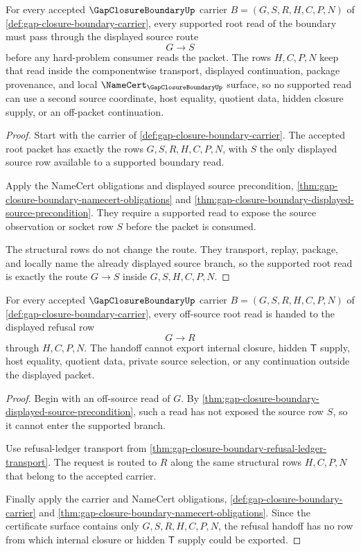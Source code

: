 \begin{theorem}
\label{thm:gap-closure-boundary-root-source-totality}
For every accepted $\GapClosureBoundaryUp$ carrier $B=(G,S,R,H,C,P,N)$ of \autoref{def:gap-closure-boundary-carrier}, every supported root read of the boundary must pass through the displayed source route
$$
G \longrightarrow S
$$
before any hard-problem consumer reads the packet. The rows $H,C,P,N$ keep that read inside the componentwise transport, displayed continuation, package provenance, and local $\NameCert_{\GapClosureBoundaryUp}$ surface, so no supported read can use a second source coordinate, host equality, quotient data, hidden closure supply, or an off-packet continuation.
\end{theorem}
\begin{proof}
Start with the carrier of \autoref{def:gap-closure-boundary-carrier}. The accepted root packet has exactly the rows $G,S,R,H,C,P,N$, with $S$ the only displayed source row available to a supported boundary read.

Apply the NameCert obligations and displayed source precondition, \autoref{thm:gap-closure-boundary-namecert-obligations} and \autoref{thm:gap-closure-boundary-displayed-source-precondition}. They require a supported read to expose the source observation or socket row $S$ before the packet is consumed.

The structural rows do not change the route. They transport, replay, package, and locally name the already displayed source branch, so the supported root read is exactly the route $G \longrightarrow S$ inside $G,S,H,C,P,N$.
\end{proof}

\begin{theorem}
\label{thm:gap-closure-boundary-root-refusal-handoff-totality}
For every accepted $\GapClosureBoundaryUp$ carrier $B=(G,S,R,H,C,P,N)$ of \autoref{def:gap-closure-boundary-carrier}, every off-source root read is handed to the displayed refusal row
$$
G \longrightarrow R
$$
through $H,C,P,N$. The handoff cannot export internal closure, hidden $\mathsf{T}$ supply, host equality, quotient data, private source selection, or any continuation outside the displayed packet.
\end{theorem}
\begin{proof}
Begin with an off-source read of $G$. By \autoref{thm:gap-closure-boundary-displayed-source-precondition}, such a read has not exposed the source row $S$, so it cannot enter the supported branch.

Use refusal-ledger transport from \autoref{thm:gap-closure-boundary-refusal-ledger-transport}. The request is routed to $R$ along the same structural rows $H,C,P,N$ that belong to the accepted carrier.

Finally apply the carrier and NameCert obligations, \autoref{def:gap-closure-boundary-carrier} and \autoref{thm:gap-closure-boundary-namecert-obligations}. Since the certificate surface contains only $G,S,R,H,C,P,N$, the refusal handoff has no row from which internal closure or hidden $\mathsf{T}$ supply could be exported.
\end{proof}

